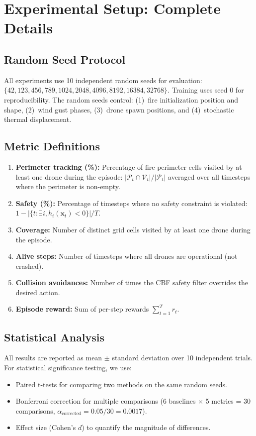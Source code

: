 \documentclass[12pt,a4paper]{article}
\DeclareRobustCommand{\cP}{\mathcal{P}}
\DeclareRobustCommand{\cV}{\mathcal{V}}
\DeclareRobustCommand{\vect}[1]{\bm{#1}}
\begin{document}
\section{Experimental Setup: Complete Details}
\label{app:exp_details}

\subsection{Random Seed Protocol}

All experiments use 10 independent random seeds for evaluation: $\{42, 123, 456, 789, 1024, 2048, 4096, 8192, 16384, 32768\}$. Training uses seed 0 for reproducibility. The random seeds control: (1)~fire initialization position and shape, (2)~wind gust phases, (3)~drone spawn positions, and (4)~stochastic thermal displacement.

\subsection{Metric Definitions}

\begin{enumerate}[leftmargin=*]
    \item \textbf{Perimeter tracking (\%):} Percentage of fire perimeter cells visited by at least one drone during the episode: $|\cP_t \cap \cV_t| / |\cP_t|$ averaged over all timesteps where the perimeter is non-empty.
    \item \textbf{Safety (\%):} Percentage of timesteps where no safety constraint is violated: $1 - |\{t : \exists i, h_i(\vect{x}_t) < 0\}| / T$.
    \item \textbf{Coverage:} Number of distinct grid cells visited by at least one drone during the episode.
    \item \textbf{Alive steps:} Number of timesteps where all drones are operational (not crashed).
    \item \textbf{Collision avoidances:} Number of times the CBF safety filter overrides the desired action.
    \item \textbf{Episode reward:} Sum of per-step rewards $\sum_{t=1}^T r_t$.
\end{enumerate}

\subsection{Statistical Analysis}

All results are reported as mean $\pm$ standard deviation over 10 independent trials. For statistical significance testing, we use:
\begin{itemize}[leftmargin=*]
    \item Paired t-tests for comparing two methods on the same random seeds.
    \item Bonferroni correction for multiple comparisons (6 baselines $\times$ 5 metrics = 30 comparisons, $\alpha_{\text{corrected}} = 0.05/30 = 0.0017$).
    \item Effect size (Cohen's $d$) to quantify the magnitude of differences.
\end{itemize}
\end{document}
